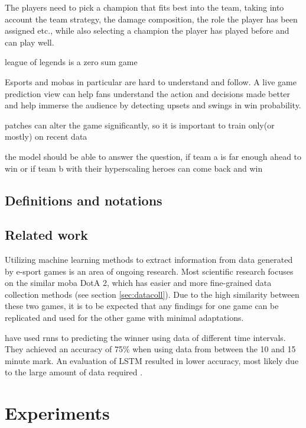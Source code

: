 \documentclass[12pt, a4paper, headinclude, twoside, plainheadsepline, open=right, numbers=noenddot, hidelinks, toc=listof, toc=bibliography]{scrreprt}
\begin{document}
The players need to pick a champion that fits best into the team, taking into account the team strategy, the damage composition, the role the player has been assigned etc., while also selecting a champion the player has played before and can play well.

league of legends is a zero sum game

Esports and mobas in particular are hard to understand and follow. A live game prediction view can help fans understand the action and decisions made better and help immerse the audience by detecting upsets and swings in win probability.

patches can alter the game significantly, so it is important to train only(or mostly) on recent data


the model should be able to answer the question, if team a is far enough ahead to win or if team b with their hyperscaling heroes can come back and win


\section{Definitions and notations}
\label{sec:defandnot}


\section{Related work}
\label{sec:related}

Utilizing machine learning methods to extract information from data generated by e-sport games is an area of ongoing research.
Most scientific research focuses on the similar \ac{moba} DotA 2, which has easier and more fine-grained data collection methods (see section \ref{sec:datacoll}).
Due to the high similarity between these two games, it is to be expected that any findings for one game can be replicated and used for the other game with minimal adaptations.

 have used \acp{rnn} to predicting the winner using data of different time intervals. They achieved an accuracy of 75\% when using data from between the 10 and 15 minute mark.
An evaluation of LSTM resulted in lower accuracy, most likely due to the large amount of data required \cite{silvaContinuousOutcomePrediction2018}.






\chapter{Experiments}
\label{chap:experiments}
\end{document}
